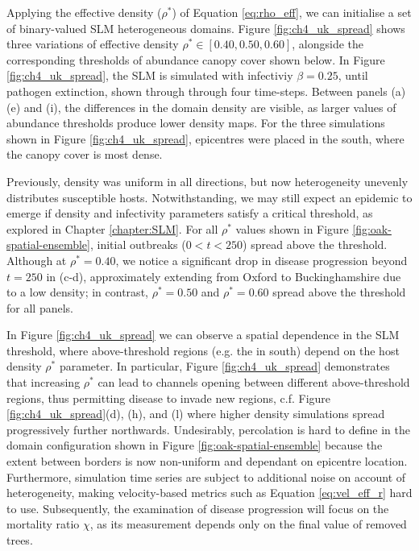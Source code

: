 Applying the effective density ($\rho^{*}$) of Equation \ref{eq:rho_eff},
we can initialise a set of binary-valued SLM heterogeneous domains. 
Figure \ref{fig:ch4_uk_spread} shows three variations of effective density
$\rho^{*} \in [0.40, 0.50, 0.60]$, alongside the corresponding thresholds of
abundance canopy cover shown below. In Figure \ref{fig:ch4_uk_spread}, the SLM
is simulated with infectiviy $\beta=0.25$, until pathogen extinction, 
shown through through four time-steps. Between panels (a) (e) and (i), 
the differences in the domain density are visible,
as larger values of abundance thresholds produce lower density maps.
For the three simulations shown in Figure \ref{fig:ch4_uk_spread}, 
epicentres were placed in the south, where the canopy cover is most dense. 

Previously, density was uniform in all directions, 
but now heterogeneity unevenly distributes susceptible hosts. 
Notwithstanding, we may still expect an epidemic to emerge if density 
and infectivity parameters satisfy a critical threshold, as explored in Chapter \ref{chapter:SLM}.
For all $\rho^*$ values shown in Figure \ref{fig:oak-spatial-ensemble}, 
initial outbreaks ($0<t<250$) spread above the threshold.
Although at $\rho^*=0.40$, we notice a significant drop in disease progression 
beyond $t=250$ in (c-d), approximately extending from Oxford to Buckinghamshire due to a low density;
in contrast, $\rho^*=0.50$ and $\rho^*=0.60$ spread above the threshold for all panels.

In Figure \ref{fig:ch4_uk_spread} we can observe a spatial dependence in the SLM threshold,
where above-threshold regions (e.g. the in south) depend on the host density $\rho^*$ parameter.
In particular, Figure \ref{fig:ch4_uk_spread} demonstrates that increasing $\rho^*$ can lead to channels opening between different above-threshold regions, thus permitting disease to invade new regions, c.f. Figure \ref{fig:ch4_uk_spread}(d), (h), and (l) where higher density simulations spread progressively further northwards.
Undesirably, percolation is hard to define in the domain configuration shown in 
Figure \ref{fig:oak-spatial-ensemble} because the extent between borders is now non-uniform
and dependant on epicentre location.
Furthermore, simulation time series are subject to additional noise on account of heterogeneity, 
making velocity-based metrics such as Equation \ref{eq:vel_eff_r} hard to use. 
Subsequently, the examination of disease progression will focus on the mortality ratio $\chi$, 
as its measurement depends only on the final value of removed trees.

